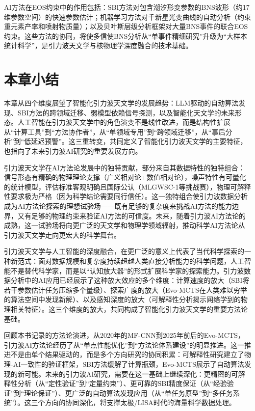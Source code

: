 AI方法在EOS约束中的作用包括：SBI方法对包含潮汐形变参数的BNS波形（约17维参数空间）的快速参数估计；机器学习方法对千新星光变曲线的自动分析（约束重元素产率和喷射物质量）；以及贝叶斯层级分析框架对大量BNS事件的联合EOS约束。这些方法的协同，将使多信使BNS分析从“单事件精细研究”升级为“大样本统计科学”，是引力波天文学与核物理学深度融合的技术基础。

\section{本章小结}

本章从四个维度展望了智能化引力波天文学的发展趋势：LLM驱动的自动算法发现、SBI方法的跨领域迁移、弱模型依赖信号探测，以及智能化天文学的未来形态。人工智能在引力波天文学中的角色演变不是线性改进，而是结构性扩展——从“计算工具”到“方法协作者”，从“单领域专用”到“跨领域迁移”，从“事后分析”到“低延迟预警”。这三重转变，共同定义了智能化引力波天文学的主要特征，也指向了未来引力波AI研究的重要发展方向。

引力波天文学在AI方法论发展中的独特贡献，部分来自其数据特性的独特组合：信号形态有精确的物理理论支撑（广义相对论+数值相对论），噪声特性有可量化的统计模型，评估标准客观明确且国际公认（MLGWSC-1等挑战赛），物理可解释性要求极为严格（因为科学结论需要同行信任）。这一独特组合使引力波数据分析成为AI方法论探索的理想试验场——既有足够的复杂度来挑战AI方法的能力边界，又有足够的物理约束来验证AI方法的可信度。未来，随着引力波AI方法论的成熟，这一试验场将向更广泛的天文学和物理学领域辐射，推动科学AI方法论从引力波天文学走向更宏大的科学舞台。

引力波天文学与人工智能的深度融合，在更广泛的意义上代表了当代科学探索的一种新范式：面对数据规模和复杂度持续超越人类直接分析能力的科学问题，人工智能不是替代科学家，而是以“认知放大器”的形式扩展科学家的探索能力。引力波数据分析中的AI应用已经展示了这种放大效应的多个维度：计算速度的放大（SBI将若干参数估计任务压缩多个量级）、探索广度的放大（Evo-MCTS在人类难以穷举的算法空间中发现新解）、以及感知深度的放大（可解释性分析揭示网络学到的物理相关特征）。这三个维度的放大，共同构成了智能化引力波天文学的重要方法论基础。

回顾本书记录的方法论演进，从2020年的MF-CNN到2025年前后的Evo-MCTS，引力波AI方法论经历了从“单点性能优化”到“方法论体系建设”的明显推进。这一推进不是由单个结果驱动的，而是多个方向研究的协同积累：可解释性研究建立了物理-AI一致性的验证框架，SBI方法缓解了计算瓶颈，Evo-MCTS展示了自动算法发现的新可能。未来的引力波AI研究，需要在这一基础上继续深化：更精密的可解释性分析（从“定性验证”到“定量约束”）、更可靠的SBI精度保证（从“经验验证”到“理论保证”）、更广泛的自动算法发现应用（从“单任务原型”到“多任务系统”）。这三个方向的协同深化，将支撑太极/LISA时代的海量科学数据处理。

